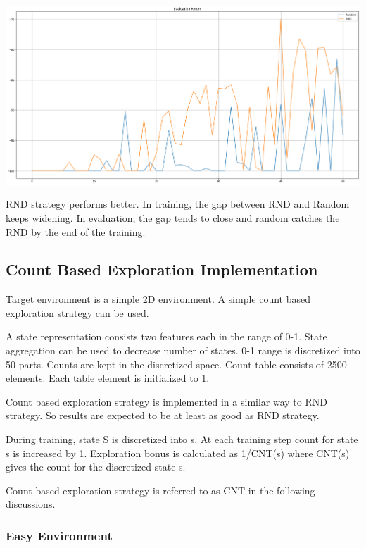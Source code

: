\documentclass[11pt]{article}
\begin{document}
    \hspace*{-0.6in}
    \includegraphics[scale=0.30]{p1/q1-hard-eval-compare}

    RND strategy performs better.
    In training, the gap between RND and Random keeps widening.
    In evaluation, the gap tends to close and random catches the RND by the end of the training.

    \subsection{Count Based Exploration Implementation}

    Target environment is a simple 2D environment.
    A simple count based exploration strategy can be used.

    A state representation consists two features each in the range of 0-1.
    State aggregation can be used to decrease number of states.
    0-1 range is discretized into 50 parts.
    Counts are kept in the discretized space.
    Count table consists of 2500 elements.
    Each table element is initialized to 1.

    Count based exploration strategy is implemented in a similar way to RND strategy.
    So results are expected to be at least as good as RND strategy.

    During training, state S is discretized into s.
    At each training step count for state s is increased by 1.
    Exploration bonus is calculated as 1/CNT(s) where CNT(s) gives the count for the discretized state s.

    Count based exploration strategy is referred to as CNT in the following discussions.

    \subsubsection{Easy Environment}
\end{document}
